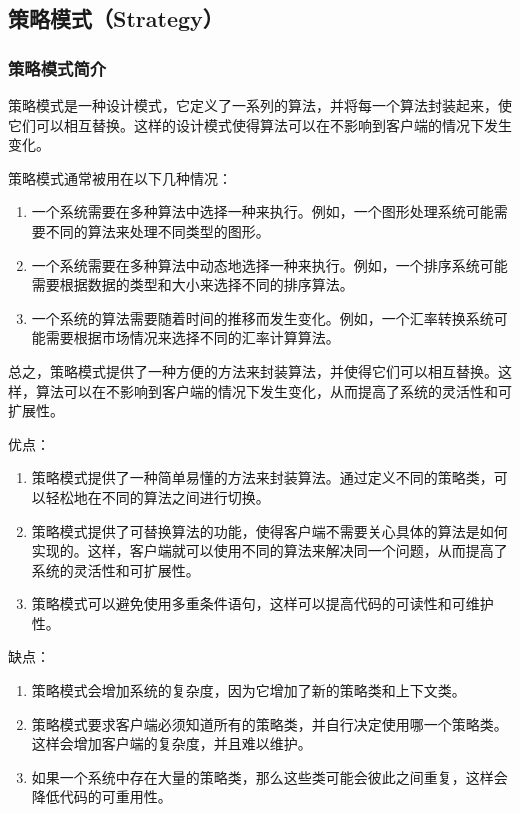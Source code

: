 \subsection{策略模式（Strategy）}

\subsubsection{策略模式简介}

策略模式是一种设计模式，它定义了一系列的算法，并将每一个算法封装起来，使它们可以相互替换。这样的设计模式使得算法可以在不影响到客户端的情况下发生变化。

策略模式通常被用在以下几种情况：
\begin{enumerate}
    \item 一个系统需要在多种算法中选择一种来执行。例如，一个图形处理系统可能需要不同的算法来处理不同类型的图形。
    \item 一个系统需要在多种算法中动态地选择一种来执行。例如，一个排序系统可能需要根据数据的类型和大小来选择不同的排序算法。
    \item 一个系统的算法需要随着时间的推移而发生变化。例如，一个汇率转换系统可能需要根据市场情况来选择不同的汇率计算算法。
\end{enumerate}

总之，策略模式提供了一种方便的方法来封装算法，并使得它们可以相互替换。这样，算法可以在不影响到客户端的情况下发生变化，从而提高了系统的灵活性和可扩展性。

优点：
\begin{enumerate}
    \item 策略模式提供了一种简单易懂的方法来封装算法。通过定义不同的策略类，可以轻松地在不同的算法之间进行切换。
    \item 策略模式提供了可替换算法的功能，使得客户端不需要关心具体的算法是如何实现的。这样，客户端就可以使用不同的算法来解决同一个问题，从而提高了系统的灵活性和可扩展性。
    \item 策略模式可以避免使用多重条件语句，这样可以提高代码的可读性和可维护性。
\end{enumerate}

缺点：
\begin{enumerate}
    \item 策略模式会增加系统的复杂度，因为它增加了新的策略类和上下文类。
    \item 策略模式要求客户端必须知道所有的策略类，并自行决定使用哪一个策略类。这样会增加客户端的复杂度，并且难以维护。
    \item 如果一个系统中存在大量的策略类，那么这些类可能会彼此之间重复，这样会降低代码的可重用性。
\end{enumerate}

